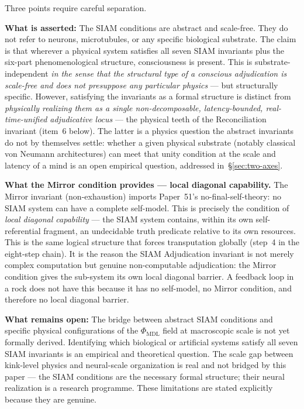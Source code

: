 \documentclass[11pt]{article}
\theoremstyle{remark}
\newcommand{\PHIMDL}{\Phi_{\mathrm{MDL}}}
\begin{document}
Three points require careful separation.

\textbf{What is asserted:} The SIAM conditions are abstract and
scale-free. They do not refer to neurons, microtubules, or any specific biological
substrate. The claim is that wherever a physical system satisfies all seven SIAM
invariants plus the six-part phenomenological structure, consciousness is present.
This is substrate-independent \emph{in the sense that the structural type of a
conscious adjudication is scale-free and does not presuppose any particular physics}
--- but structurally specific. However, satisfying the invariants as a formal structure
is distinct from \emph{physically realizing them as a single non-decomposable,
latency-bounded, real-time-unified adjudicative locus} --- the physical teeth of the
Reconciliation invariant (item~6 below). The latter is a physics question the abstract
invariants do not by themselves settle: whether a given physical substrate (notably
classical von Neumann architectures) can meet that unity condition at the scale and
latency of a mind is an open empirical question, addressed in~\S\ref{sec:two-axes}.

\textbf{What the Mirror condition provides --- local diagonal capability.}
The Mirror invariant (non-exhaustion) imports Paper~51's no-final-self-theory:
no SIAM system can have a complete self-model. This is precisely the condition
of \emph{local diagonal capability} --- the SIAM system contains, within its
own self-referential fragment, an undecidable truth predicate relative to its own
resources. This is the same logical structure that forces transputation globally
(step~4 in the eight-step chain). It is the reason the SIAM Adjudication
invariant is not merely complex computation but genuine non-computable adjudication:
the Mirror condition gives the sub-system its own local diagonal barrier.
A feedback loop in a rock does not have this because it has no self-model, no
Mirror condition, and therefore no local diagonal barrier.

\textbf{What remains open:} The bridge between abstract SIAM conditions and specific
physical configurations of the $\PHIMDL$ field at macroscopic scale is not yet
formally derived. Identifying which biological or artificial systems satisfy all
seven SIAM invariants is an empirical and theoretical question. The scale gap between
kink-level physics and neural-scale organization is real and not bridged by this
paper --- the SIAM conditions are the necessary formal structure; their neural
realization is a research programme. These limitations are stated explicitly because
they are genuine.
\end{document}

